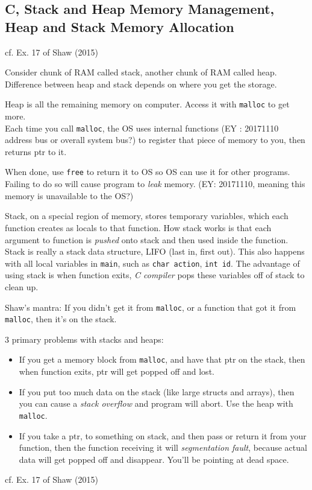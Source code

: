 \documentclass[10pt]{amsart}
\begin{document}
\begin{multicols*}{2}
\section{C, Stack and Heap Memory Management, Heap and Stack Memory Allocation}  

cf. Ex. 17 of Shaw (2015) \cite{Shaw2015}

Consider chunk of RAM called stack, another chunk of RAM called heap.  Difference between heap and stack depends on where you get the storage.  

Heap is all the remaining memory on computer.  Access it with \verb|malloc| to get more.  \\
Each time you call \verb|malloc|, the OS uses internal functions (EY : 20171110 address bus or overall system bus?) to register that piece of memory to you, then returns ptr to it.  

When done, use \verb|free| to return it to OS so OS can use it for other programs.  Failing to do so will cause program to \emph{leak} memory.  (EY: 20171110, meaning this memory is unavailable to the OS?)

Stack, on a special region of memory, stores temporary variables, which each function creates as locals to that function.  How stack works is that each argument to function is \emph{pushed} onto stack and then used inside the function.  Stack is really a stack data structure, LIFO (last in, first out).  This also happens with all local variables in \verb|main|, such as \verb|char action|, \verb|int id|.  The advantage of using stack is when function exits, \emph{C compiler} pops these variables off of stack to clean up.  

Shaw's mantra: If you didn't get it from \verb|malloc|, or a function that got it from \verb|malloc|, then it's on the stack.  

3 primary problems with stacks and heaps: 
\begin{itemize}
	\item If you get a memory block from \verb|malloc|, and have that ptr on the stack, then when function exits, ptr will get popped off and lost.  
	\item If you put too much data on the stack (like large structs and arrays), then you can cause a \emph{stack overflow} and program will abort.  Use the heap with \verb|malloc|.  
	\item If you take a ptr, to something on stack, and then pass or return it from your function, then the function receiving it will \emph{segmentation fault}, because actual data will get popped off and disappear.  You'll be pointing at dead space.  
\end{itemize}
cf. Ex. 17 of Shaw (2015) \cite{Shaw2015}



\end{multicols*}
\end{document}
